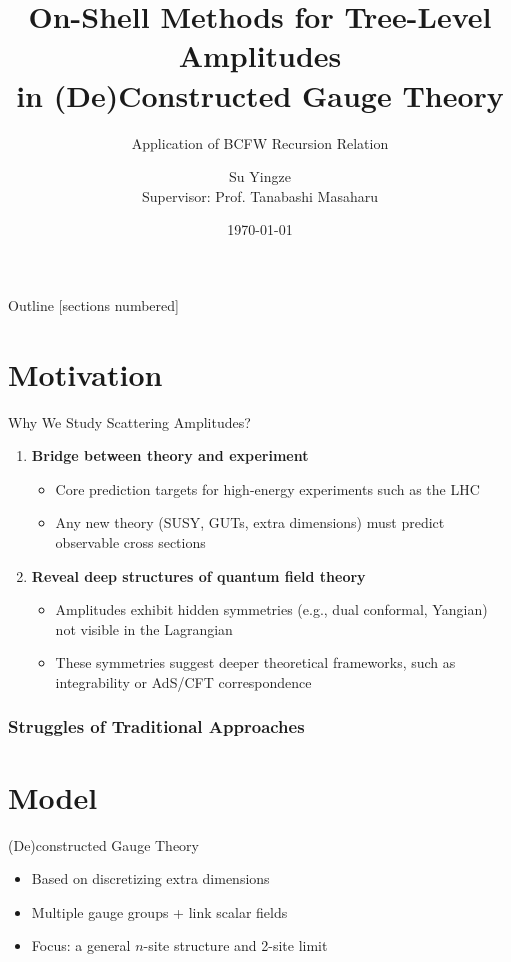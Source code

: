 \documentclass{beamer}
\title{On-Shell Methods for Tree-Level Amplitudes\\ in (De)Constructed Gauge Theory}
\subtitle{Application of BCFW Recursion Relation}
\author[Su Yingze]{
  Su Yingze\\
  Supervisor: Prof. Tanabashi Masaharu
}
\institute{Theoretical Particle Physics Laboratory, Nagoya University}
\date{\today}
\begin{document}
\maketitle

\begin{frame}{Outline}
  [sections numbered]
  \tableofcontents[currentsection]
\end{frame}



\section{Motivation}
\begin{frame}{Why We Study Scattering Amplitudes?}
  \begin{enumerate}
    \item \textbf{Bridge between theory and experiment}
    \begin{itemize}
      \item Core prediction targets for high-energy experiments such as the LHC
      \item Any new theory (SUSY, GUTs, extra dimensions) must predict observable cross sections
    \end{itemize}
    \pause
    \item \textbf{Reveal deep structures of quantum field theory}
    \begin{itemize}
      \item Amplitudes exhibit hidden symmetries (e.g., dual conformal, Yangian) not visible in the Lagrangian
      \item These symmetries suggest deeper theoretical frameworks, such as integrability or AdS/CFT correspondence
    \end{itemize}
  \end{enumerate}
\end{frame}
\begin{frame}
    \frametitle{Struggles of Traditional Approaches}
  
\end{frame}

\section{Model}
\begin{frame}{(De)constructed Gauge Theory}
  \begin{itemize}
    \item Based on discretizing extra dimensions
    \item Multiple gauge groups + link scalar fields
    \item Focus: a general $n$-site structure and 2-site limit
  \end{itemize}
\end{frame}
\end{document}
